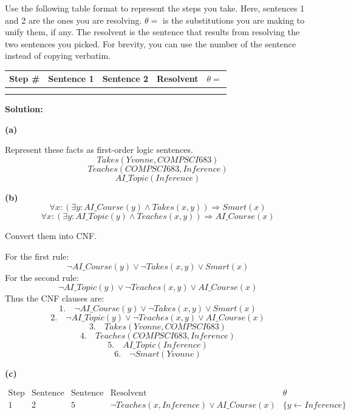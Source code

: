 \documentclass[10pt,a4paper]{exam}
\begin{document}
\begin{questions}

Use the following table format to represent the steps you take. Here, sentences 1 and 2 are the ones you are resolving. $\theta = $ is the substitutions you are making to unify them, if any. The resolvent is the sentence that results from resolving the two sentences you picked. For brevity, you can use the number of the sentence instead of copying verbatim.

\begin{center}
\begin{tabular}{lcccc}
    \toprule
    Step \# & Sentence 1 & Sentence 2 & Resolvent & $\theta =$\\
    \midrule
     & & & & \\
     & & & & \\
    \bottomrule
\end{tabular}
\end{center}

\textbf{Solution:}

\textbf{(a)}

Represent these facts as first-order logic sentences.
\[
Takes(Yvonne, COMPSCI683)
\]
\[
Teaches(COMPSCI683, Inference)
\]
\[
AI\_Topic(Inference)
\]

\textbf{(b)}
\[
\forall x : \left( \exists y : AI\_Course(y) \wedge Takes(x,y) \right)
\Rightarrow Smart(x)
\]
\[
\forall x : \left( \exists y : AI\_Topic(y) \wedge Teaches(x,y) \right)
\Rightarrow AI\_Course(x)
\]

Convert them into CNF.

For the first rule:
\[
\neg AI\_Course(y) \vee \neg Takes(x,y) \vee Smart(x)
\]
For the second rule:
\[
\neg AI\_Topic(y) \vee \neg Teaches(x,y) \vee AI\_Course(x)
\]
Thus the CNF clauses are:
\[
1.\quad \neg AI\_Course(y) \vee \neg Takes(x,y) \vee Smart(x)
\]
\[
2.\quad \neg AI\_Topic(y) \vee \neg Teaches(x,y) \vee AI\_Course(x)
\]
\[
3.\quad Takes(Yvonne, COMPSCI683)
\]
\[
4.\quad Teaches(COMPSCI683, Inference)
\]
\[
5.\quad AI\_Topic(Inference)
\]
\[
6.\quad \neg Smart(Yvonne)
\]

\textbf{(c)}

\[
\begin{array}{c|c|c|c|c}
\text{Step \#} & \text{Sentence 1} & \text{Sentence 2} & \text{Resolvent} & \theta \\ \hline
1 & 2 & 5 
& \neg Teaches(x,Inference) \vee AI\_Course(x)
& \{y\leftarrow Inference\} \\


\end{array}\]
\end{questions}
\end{document}
